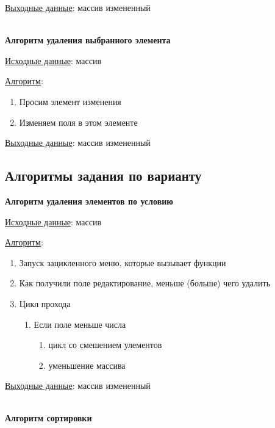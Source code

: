 \underline{Выходные данные}: массив измененный

\hspace{0pt}\\



\textbf{Алгоритм удаления выбранного элемента}

\underline{Исходные данные}: массив

\underline{Алгоритм}:

\begin{enumerate}
    \item Просим элемент изменения
    \item Изменяем поля в этом элементе
\end{enumerate}

\underline{Выходные данные}: массив измененный



\subsection{Алгоритмы задания по варианту}

\textbf{Алгоритм удаления элементов по условию}

\underline{Исходные данные}: массив

\underline{Алгоритм}:

\begin{enumerate}
    \item Запуск зацикленного меню, которые вызывает функции
    \item Как получили поле редактирование, меньше (больше) чего удалить
    \item Цикл прохода
    \begin{enumerate}
        \item Если поле меньше числа
        \begin{enumerate}
            \item цикл со смешением улементов
            \item уменьшение массива
        \end{enumerate}
    \end{enumerate}
\end{enumerate}

\underline{Выходные данные}: массив измененный

\hspace{0pt}\\



\textbf{Алгоритм сортировки}

